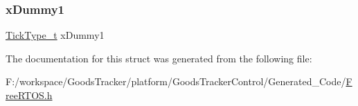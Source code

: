 \subsubsection{\texorpdfstring{x\+Dummy1}{xDummy1}}
{\footnotesize\ttfamily \hyperlink{portmacro_8h_aa69c48c6e902ce54f70886e6573c92a9}{Tick\+Type\+\_\+t} x\+Dummy1}



The documentation for this struct was generated from the following file\+:\begin{DoxyCompactItemize}
\item 
F\+:/workspace/\+Goods\+Tracker/platform/\+Goods\+Tracker\+Control/\+Generated\+\_\+\+Code/\hyperlink{_free_r_t_o_s_8h}{Free\+R\+T\+O\+S.\+h}\end{DoxyCompactItemize}
